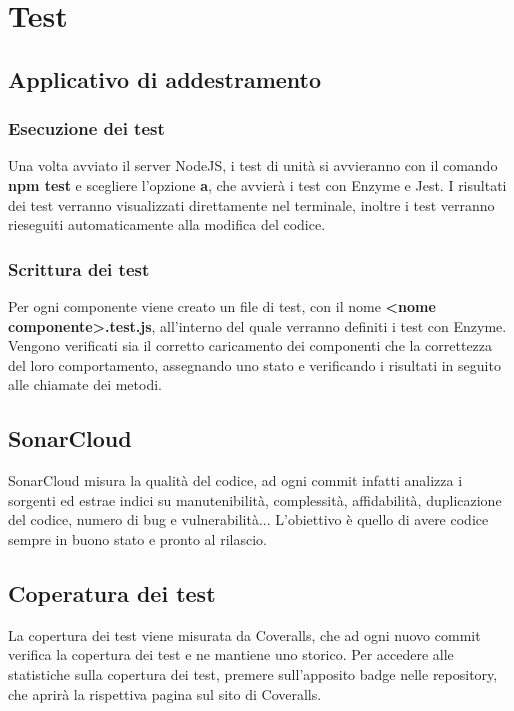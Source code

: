 \section{Test}
	\subsection{Applicativo di addestramento}
		\subsubsection{Esecuzione dei test}
			Una volta avviato il server NodeJS, i test di unità si avvieranno con il comando \textbf{npm test} e scegliere l'opzione \textbf{a}, che avvierà i test con Enzyme e Jest. I risultati dei test verranno visualizzati direttamente nel terminale, inoltre i test verranno rieseguiti automaticamente alla modifica del codice.
		\subsubsection{Scrittura dei test}
			Per ogni componente viene creato un file di test, con il nome \textbf{<nome componente>.test.js}, all'interno del quale verranno definiti i test con Enzyme. Vengono verificati sia il corretto caricamento dei componenti che la correttezza del loro comportamento, assegnando uno stato e verificando i risultati in seguito alle chiamate dei metodi.
	\subsection{SonarCloud}
		SonarCloud misura la qualità del codice, ad ogni commit infatti analizza i sorgenti ed estrae indici su manutenibilità, complessità, affidabilità, duplicazione del codice, numero di bug e vulnerabilità... L'obiettivo è quello di avere codice sempre in buono stato e pronto al rilascio.
	\subsection{Coperatura dei test}
		La copertura dei test viene misurata da Coveralls, che ad ogni nuovo commit verifica la copertura dei test e ne mantiene uno storico. Per accedere alle statistiche sulla copertura dei test, premere sull'apposito badge nelle repository\glo, che aprirà la rispettiva pagina sul sito di Coveralls.
